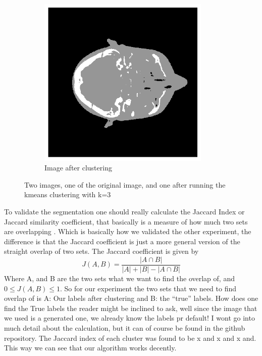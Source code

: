 \documentclass[12pt]{report}
\begin{document}
\begin{figure}[h]
\begin{subfigure}[t]{0.5\textwidth}
        \includegraphics[width=0.9\textwidth]{images/clustering512.png}
        \caption{Image after clustering}
    \end{subfigure}
    \caption{Two images, one of the original image, and one after running the kmeans clustering with k=3}
\end{figure}
To validate the segmentation one should really calculate the Jaccard Index or Jaccard similarity coefficient, that basically is a measure of how much two sets are overlapping \cite{jaccard}. Which is basically how we validated the other experiment, the difference is that the Jaccard coefficient is just a more general version of the straight overlap of two sets.  The Jaccard coefficient is given by
\begin{equation}
J(A,B) = \frac{|A\cap B|}{|A|+|B|-|A\cap B|}
\end{equation}
Where A, and B are the two sets what we want to find the overlap of, and $0\leq J(A,B) \leq 1$. So for our experiment the two sets that we need to find overlap of is A: Our labels after clustering and B: the ``true'' labels. How does one find the True labels the reader might be inclined to ask, well since the image that we used is a generated one, we already know the labels pr default! I wont go into much detail about the calculation, but it can of course be found in the github repository. The Jaccard index of each cluster was found to be x and x and x and. This way we can see that our algorithm works decently.
\end{document}
